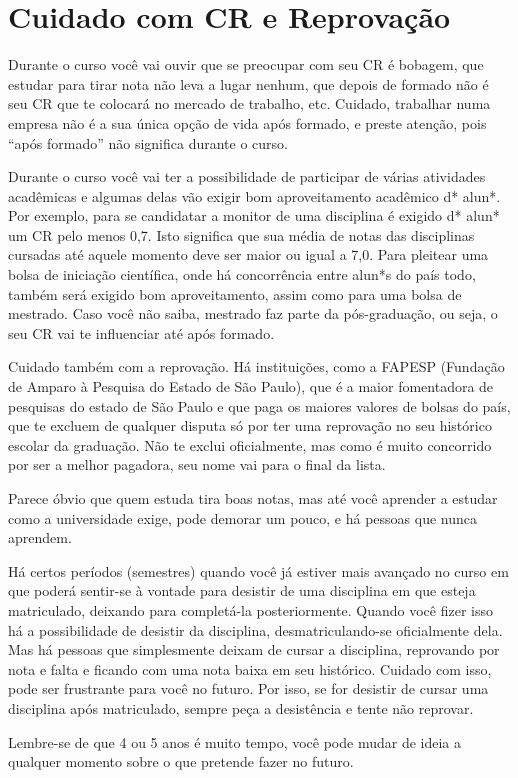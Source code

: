 
\section{Cuidado com CR e Reprovação}

Durante o curso você vai ouvir que se preocupar com seu CR é bobagem, que
estudar para tirar nota não leva a lugar nenhum, que depois de formado não é seu
CR que te colocará no mercado de trabalho, etc. Cuidado, trabalhar numa empresa
não é a sua única opção de vida após formado, e preste atenção, pois ``após
formado'' não significa durante o curso.

Durante o curso você vai ter a possibilidade de participar de várias atividades
acadêmicas e algumas delas vão exigir bom aproveitamento acadêmico d* alun*. Por
exemplo, para se candidatar a monitor de uma disciplina é exigido d* alun* um CR
pelo menos 0,7. Isto significa que sua média de notas das disciplinas cursadas
até aquele momento deve ser maior ou igual a 7,0. Para pleitear uma bolsa de
iniciação científica, onde há concorrência entre alun*s do país todo, também
será exigido bom aproveitamento, assim como para uma bolsa de mestrado. Caso
você não saiba, mestrado faz parte da pós-graduação, ou seja, o seu CR vai te
influenciar até após formado.

Cuidado também com a reprovação. Há instituições, como a FAPESP (Fundação de
Amparo à Pesquisa do Estado de São Paulo), que é a maior fomentadora de
pesquisas do estado de São Paulo e que paga os maiores valores de bolsas do
país, que te excluem de qualquer disputa só por ter uma reprovação no seu
histórico escolar da graduação. Não te exclui oficialmente, mas como é muito
concorrido por ser a melhor pagadora, seu nome vai para o final da lista.

Parece óbvio que quem estuda tira boas notas, mas até você aprender a estudar
como a universidade exige, pode demorar um pouco, e há pessoas que nunca
aprendem.

Há certos períodos (semestres) quando você já estiver mais avançado no curso em
que poderá sentir-se à vontade para desistir de uma disciplina em que esteja
matriculado, deixando para completá-la posteriormente. Quando você fizer isso há
a possibilidade de desistir da disciplina, desmatriculando-se oficialmente dela.
Mas há pessoas que simplesmente deixam de cursar a disciplina, reprovando por
nota e falta e ficando com uma nota baixa em seu histórico. Cuidado com isso,
pode ser frustrante para você no futuro. Por isso, se for desistir de cursar uma
disciplina após matriculado, sempre peça a desistência e tente não reprovar.

Lembre-se de que 4 ou 5 anos é muito tempo, você pode mudar de ideia a qualquer
momento sobre o que pretende fazer no futuro.
